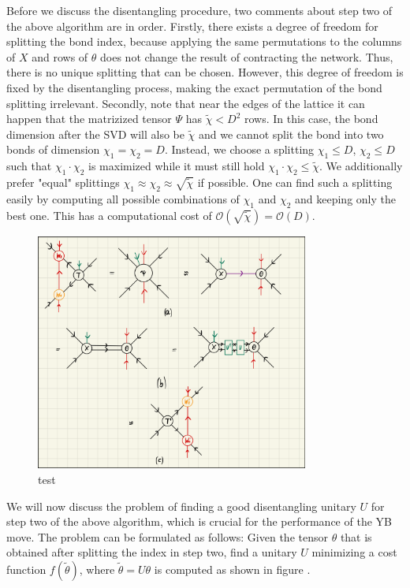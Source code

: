 Before we discuss the disentangling procedure, two comments about step two of the above algorithm are in order. Firstly, there exists a degree of freedom for splitting the bond index, because applying the same permutations to the columns of $X$ and rows of $\theta$ does not change the result of contracting the network. Thus, there is no unique splitting that can be chosen. However, this degree of freedom is fixed by the disentangling process, making the exact permutation of the bond splitting irrelevant. Secondly, note that near the edges of the lattice it can happen that the matrizized tensor $\Psi$ has $\tilde{\chi} < D^2$ rows. In this case, the bond dimension after the SVD will also be $\tilde{\chi}$ and we cannot split the bond into two bonds of dimension $\chi_1=\chi_2=D$. Instead, we choose a splitting $\chi_1 \le D$, $\chi_2 \le D$ such that $\chi_1\cdot\chi_2$ is maximized while it must still hold $\chi_1\cdot\chi_2\le\tilde{\chi}$. We additionally prefer "equal" splittings $\chi_1\approx\chi_2\approx\sqrt{\tilde{\chi}}$ if possible. One can find such a splitting easily by computing all possible combinations of $\chi_1$ and $\chi_2$ and keeping only the best one. This has a computational cost of $\mathcal{O}\left(\sqrt{\tilde{\chi}}\right) = \mathcal{O}\left(D\right)$. \par
\begin{figure}
	\centering
	\includegraphics[width=0.8\textwidth]{figures/Tensor_Networks/yb_move_svd_disent.jpeg}
	\caption{test}
	\label{fig:yb_move_svd_disent}
\end{figure}
We will now discuss the problem of finding a good disentangling unitary $U$ for step two of the above algorithm, which is crucial for the performance of the YB move. The problem can be formulated as follows: Given the tensor $\theta$ that is obtained after splitting the index in step two, find a unitary $U$ minimizing a cost function $f(\tilde{\theta})$, where $\tilde{\theta} = U\theta$ is computed as shown in figure \figref{}.